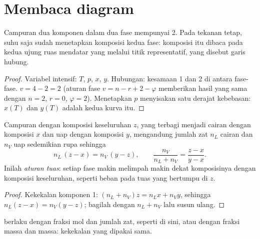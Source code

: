 \section{Membaca diagram}

\begin{proposition}\label{prop:b2:liquid-vapour-diagrams:variance}
Campuran dua komponen dalam dua fase mempunyai  2. Pada tekanan
tetap, suhu saja sudah menetapkan komposisi kedua fase: komposisi itu
dibaca pada kedua ujung ruas mendatar yang melalui titik representatif,
yang disebut garis hubung.
\end{proposition}

\begin{proof}
Variabel intensif: $T$, $p$, $x$, $y$. Hubungan: kesamaan 
1 dan 2 di antara fase-fase. $v = 4 - 2 = 2$ (aturan fase
$v = n - r + 2 - \varphi$ memberikan hasil yang sama dengan $n = 2$,
$r = 0$, $\varphi = 2$). Menetapkan $p$ menyisakan satu derajat
kebebasan: $x(T)$ dan $y(T)$ adalah kedua kurva itu.
\end{proof}

\begin{theorem}\label{thm:b2:liquid-vapour-diagrams:lever}
Campuran dengan komposisi keseluruhan $z$, yang terbagi menjadi cairan
dengan komposisi $x$ dan uap dengan komposisi $y$, mengandung jumlah zat
$n_L$ cairan dan $n_V$ uap sedemikian rupa sehingga
\[
  n_L\,(z - x) = n_V\,(y - z), \qquad \frac{n_V}{n_L + n_V} = \frac{z - x}{y - x} .
\]
Inilah \emph{aturan tuas}: setiap fase makin melimpah
makin dekat komposisinya dengan komposisi keseluruhan, seperti beban pada
tuas yang bertumpu di $z$.
\end{theorem}

\begin{proof}
Kekekalan komponen 1: $(n_L + n_V)z = n_Lx + n_Vy$, sehingga
$n_L(z - x) =
n_V(y - z)$; bagilah dengan $n_L + n_V$ lalu susun ulang.
\end{proof}

 berlaku dengan fraksi mol dan jumlah zat, seperti di sini,
atau dengan fraksi massa dan massa: kekekalan yang dipakai sama.

